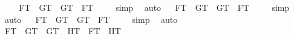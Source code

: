 \begin{isabellebody}
%
\isadelimproof
%
\endisadelimproof
\ \isanewline
\isanewline
\ \isamarkupfalse%
\ {\isachardoublequoteopen}{\isacharbrackleft}{\isacharparenleft}F{}\isactrlsup T\ \isactrlbold {\isacharequal}\ G{}\isactrlsup T{\isacharparenright}\ \isactrlbold {\isasymequiv}\ {\isacharparenleft}G{}\isactrlsup T\ \isactrlbold {\isacharequal}\ F{}\isactrlsup T{\isacharparenright}{\isacharbrackright}\ {\isacharequal}\ {\isasymtop}{\isachardoublequoteclose}%
\isadelimproof
\ %
\endisadelimproof
%
\isatagproof
{}\isamarkupfalse%
\ simp\ \isamarkupfalse%
\ auto%
\endisatagproof
{\isafoldproof}%
%
\isadelimproof
%
\endisadelimproof
\isanewline
\ \isamarkupfalse%
\ {\isachardoublequoteopen}{\isacharbrackleft}{\isacharparenleft}F{}\isactrlsup T\ \isactrlbold {\isacharequal}\ G{}\isactrlsup T{\isacharparenright}\ \isactrlbold {\isasymequiv}\ {\isacharparenleft}G{}\isactrlsup T\ \isactrlbold {\isacharequal}\ F{}\isactrlsup T{\isacharparenright}{\isacharbrackright}\ {\isacharequal}\ {\isasymtop}{\isachardoublequoteclose}%
\isadelimproof
\ %
\endisadelimproof
%
\isatagproof
{}\isamarkupfalse%
\ simp\ \isamarkupfalse%
\ auto%
\endisatagproof
{\isafoldproof}%
%
\isadelimproof
%
\endisadelimproof
\isanewline
\ \isamarkupfalse%
\ {\isachardoublequoteopen}{\isacharbrackleft}{\isacharparenleft}F{}\isactrlsup T\ \isactrlbold {\isacharequal}\ G{}\isactrlsup T{\isacharparenright}\ \isactrlbold {\isasymequiv}\ {\isacharparenleft}G{}\isactrlsup T\ \isactrlbold {\isacharequal}\ F{}\isactrlsup T{\isacharparenright}{\isacharbrackright}\ {\isacharequal}\ {\isasymtop}{\isachardoublequoteclose}%
\isadelimproof
\ %
\endisadelimproof
%
\isatagproof
{}\isamarkupfalse%
\ simp\ \isamarkupfalse%
\ auto%
\endisatagproof
{\isafoldproof}%
%
\isadelimproof
%
\endisadelimproof
\isanewline
\isanewline
\ \isamarkupfalse%
\ {\isachardoublequoteopen}{\isacharbrackleft}{\isacharparenleft}F{}\isactrlsup T\ \isactrlbold {\isacharequal}\ G{}\isactrlsup T{\isacharparenright}\ \isactrlbold {\isasymand}\ {\isacharparenleft}G{}\isactrlsup T\ \isactrlbold {\isacharequal}\ H{}\isactrlsup T{\isacharparenright}\ \isactrlbold {\isasymrightarrow}\ {\isacharparenleft}F{}\isactrlsup T\ \isactrlbold {\isacharequal}\ H{}\isactrlsup T{\isacharparenright}{\isacharbrackright}\ {\isacharequal}\ {\isasymtop}{\isachardoublequoteclose}%

\end{isabellebody}
